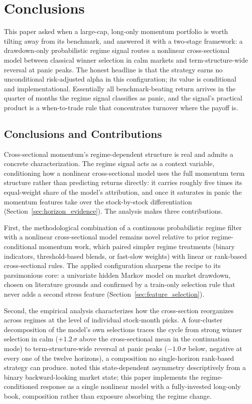 \newpage
\section{Conclusions}\label{sec:conclusion}

This paper asked when a large-cap, long-only momentum portfolio is worth tilting away from its benchmark, and answered it with a two-stage framework: a drawdown-only probabilistic regime signal routes a nonlinear cross-sectional model between classical winner selection in calm markets and term-structure-wide reversal at panic peaks. The honest headline is that the strategy earns no unconditional risk-adjusted alpha in this configuration; its value is conditional and implementational. Essentially all benchmark-beating return arrives in the quarter of months the regime signal classifies as panic, and the signal's practical product is a when-to-trade rule that concentrates turnover where the payoff is.

\subsection{Conclusions and Contributions}\label{sec:conclusions_contributions}
Cross-sectional momentum's regime-dependent structure is real and admits a concrete characterization. The regime signal acts as a context variable, conditioning how a nonlinear cross-sectional model uses the full momentum term structure rather than predicting returns directly: it carries roughly five times its equal-weight share of the model's attribution, and once it saturates in panic the momentum features take over the stock-by-stock differentiation (Section~\ref{sec:horizon_evidence}). The analysis makes three contributions.

First, the methodological combination of a continuous probabilistic regime filter with a nonlinear cross-sectional model remains novel relative to prior regime-conditional momentum work, which paired simpler regime treatments (binary indicators, threshold-based blends, or fast-slow weights) with linear or rank-based cross-sectional rules. The applied configuration sharpens the recipe to its parsimonious core: a univariate hidden Markov model on market drawdown, chosen on literature grounds and confirmed by a train-only selection rule that never adds a second stress feature (Section~\ref{sec:feature_selection}).

Second, the empirical analysis characterizes how the cross-section reorganizes across regimes at the level of individual stock-month picks. A four-cluster decomposition of the model's own selections traces the cycle from strong winner selection in calm ($+1.2\,\sigma$ above the cross-sectional mean in the continuation mode) to term-structure-wide reversal at panic peaks ($-1.0\,\sigma$ below, negative at every one of the twelve horizons), a composition no single-horizon rank-based strategy can produce. \citet{Cooper2004} noted this state-dependent asymmetry descriptively from a binary backward-looking market state; this paper implements the regime-conditioned response as a single nonlinear model with a fully-invested long-only book, composition rather than exposure absorbing the regime change.

